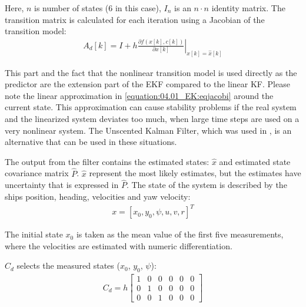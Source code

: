 
Here, \(n\) is number of states (6 in this case), \(I_n\) is an \(n \cdot n\) identity matrix.
The transition matrix is calculated for each iteration using a Jacobian of the transition model:
\begin{equation}\label{equation:04.01_EK:eqjacobi}
\begin{split}A_d[k] = I + h \left. \frac{\partial f \left(x[k],c[k] \right)}{\partial x[k]} \right|_{x[k]=\hat{x}[k]}\end{split}
\end{equation}

This part and the fact that the nonlinear transition model is used directly as the predictor are the extension part of the EKF compared to the linear KF. Please note the linear approximation in \autoref{equation:04.01_EK:eqjacobi} around the current state. This approximation can cause stability problems if the real system and the linearized system deviates too much, when large time steps are used on a very nonlinear system. The Unscented Kalman Filter, which was used in \textcite{revestido_herrero_two-step_2012}, is an alternative that can be used in these situations.


The output from the filter contains the estimated states: \(\hat{x}\) and estimated state covariance matrix \(\hat{P}\). \(\hat{x}\) represent the most likely estimates, but the estimates have uncertainty that is expressed in \(\hat{P}\).
The state of the system is described by the ships position, heading, velocities and yaw velocity:
\begin{equation}\label{equation:04.01_EK:eqstates}
\begin{split}x = [x_0,y_0,\psi,u,v,r]^T\end{split}
\end{equation}

The initial state \(x_0\) is taken as the mean value of the first five measurements, where the velocities are estimated with numeric differentiation.


\(C_d\) selects the measured states (\(x_0\), \(y_0\), \(\psi\)):
\begin{equation}\label{equation:04.01_EK:eqcd}
\begin{split}\displaystyle C_{d} = h \left[\begin{matrix}1 & 0 & 0 & 0 & 0 & 0\\0 & 1 & 0 & 0 & 0 & 0\\0 & 0 & 1 & 0 & 0 & 0\end{matrix}\right]\end{split}
\end{equation}

